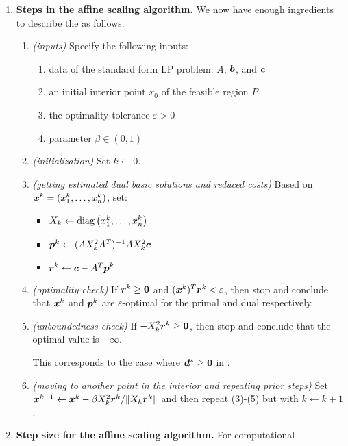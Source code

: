 \begin{enumerate}
\begin{pf}
\end{pf}
\item \textbf{Steps in the affine scaling algorithm.} We now have enough ingredients to
describe the  as follows.
\begin{enumerate}[label={(\arabic*)}]
\item \emph{(inputs)} Specify the following inputs:
\begin{enumerate}
\item data of the standard form LP problem: \(A\), \(\bm{b}\), and \(\bm{c}\)
\item an initial interior point \(x_0\) of the feasible region \(P\)
\item the optimality tolerance \(\varepsilon>0\)
\item parameter \(\beta\in (0,1)\)
\end{enumerate}
\item \emph{(initialization)} Set \(k\leftarrow 0\).
\item \emph{(getting estimated dual basic solutions and reduced costs)} Based
on \(\bm{x}^{k}=(x_1^{k},\dotsc,x_n^{k})\), set:
\begin{itemize}
\item \(X_k\leftarrow\operatorname{diag}\left(x_1^{k},\dotsc,x_n^{k}\right)\)
\item \(\bm{p}^{k}\leftarrow (AX_k^{2}A^{T})^{-1}AX_{k}^{2}\bm{c}\)
\item \(\bm{r}^{k}\leftarrow \bm{c}-A^{T}\bm{p}^{k}\)
\end{itemize}
\item \emph{(optimality check)} If \(\bm{r}^{k}\ge\bm{0}\) and
\((\bm{x}^{k})^{T}\bm{r}^{k}<\varepsilon\), then stop and conclude that
\(\bm{x}^{k}\) and \(\bm{p}^{k}\) are \(\varepsilon\)-optimal for the
primal and dual respectively.
\item \emph{(unboundedness check)} If \(-X_k^{2}\bm{r}^{k}\ge\bm{0}\), then
stop and conclude that the optimal value is \(-\infty\).
\begin{note}
This corresponds to the case where \(\bm{d}^{*}\ge\bm{0}\) in
.
\end{note}
\item \emph{(moving to another point in the interior and repeating prior steps)}
Set \(\bm{x}^{k+1}\leftarrow \bm{x}^{k}-\beta
X_k^{2}\bm{r}^{k}/\|X_k\bm{r}^{k}\|\) and then repeat (3)-(5) but with
\(k\leftarrow k+1\).
\end{enumerate}
\item \textbf{Step size for the affine scaling algorithm.} For computational

\end{enumerate}

